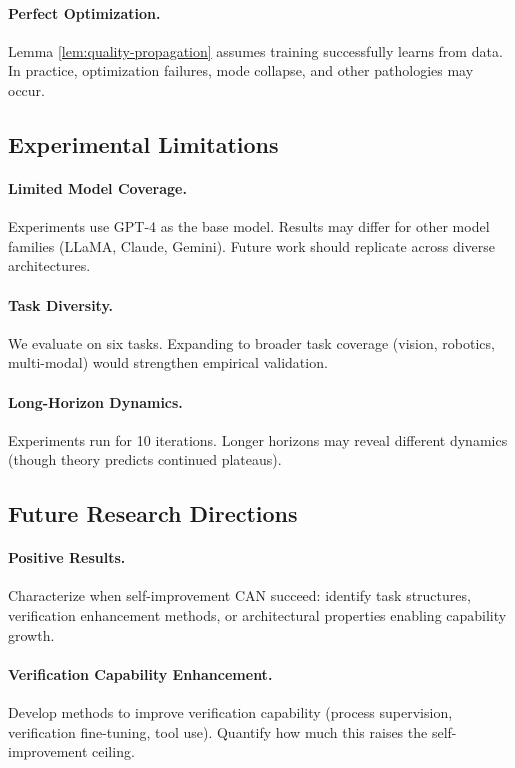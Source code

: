 \documentclass{article}
\theoremstyle{definition}
\theoremstyle{remark}
\begin{document}
\paragraph{Perfect Optimization.}
Lemma \ref{lem:quality-propagation} assumes training successfully learns from data. In practice, optimization failures, mode collapse, and other pathologies may occur.

\subsection{Experimental Limitations}

\paragraph{Limited Model Coverage.}
Experiments use GPT-4 as the base model. Results may differ for other model families (LLaMA, Claude, Gemini). Future work should replicate across diverse architectures.

\paragraph{Task Diversity.}
We evaluate on six tasks. Expanding to broader task coverage (vision, robotics, multi-modal) would strengthen empirical validation.

\paragraph{Long-Horizon Dynamics.}
Experiments run for 10 iterations. Longer horizons may reveal different dynamics (though theory predicts continued plateaus).

\subsection{Future Research Directions}

\paragraph{Positive Results.}
Characterize when self-improvement CAN succeed: identify task structures, verification enhancement methods, or architectural properties enabling capability growth.

\paragraph{Verification Capability Enhancement.}
Develop methods to improve verification capability (process supervision, verification fine-tuning, tool use). Quantify how much this raises the self-improvement ceiling.
\end{document}
